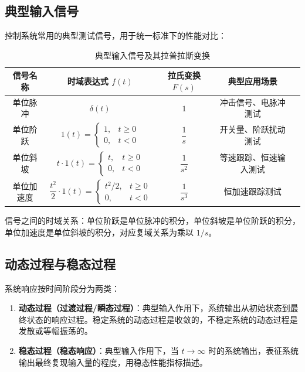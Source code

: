 \subsection{典型输入信号}
控制系统常用的典型测试信号，用于统一标准下的性能对比：
\begin{table}[htbp]
\centering
\caption{典型输入信号及其拉普拉斯变换}
\begin{tabular}{ccccc}
\toprule
信号名称 & 时域表达式 $f(t)$ & 拉氏变换 $F(s)$ & 典型应用场景 \\
\midrule
单位脉冲 & $\delta(t)$ & $1$ & 冲击信号、电脉冲测试 \\
单位阶跃 & $1(t) = \begin{cases} 1, & t\ge0 \\ 0, & t<0 \end{cases}$ & $\dfrac{1}{s}$ & 开关量、阶跃扰动测试 \\
单位斜坡 & $t\cdot1(t) = \begin{cases} t, & t\ge0 \\ 0, & t<0 \end{cases}$ & $\dfrac{1}{s^2}$ & 等速跟踪、恒速输入测试 \\
单位加速度 & $\dfrac{t^2}{2}\cdot1(t) = \begin{cases} t^2/2, & t\ge0 \\ 0, & t<0 \end{cases}$ & $\dfrac{1}{s^3}$ & 恒加速跟踪测试 \\
\bottomrule
\end{tabular}
\end{table}
信号之间的时域关系：单位阶跃是单位脉冲的积分，单位斜坡是单位阶跃的积分，单位加速度是单位斜坡的积分，对应复域关系为乘以 $1/s$。

\subsection{动态过程与稳态过程}
系统响应按时间阶段分为两类：
\begin{enumerate}
    \item \textbf{动态过程（过渡过程/瞬态过程）}：典型输入作用下，系统输出从初始状态到最终状态的响应过程。稳定系统的动态过程是收敛的，不稳定系统的动态过程是发散或等幅振荡的。
    \item \textbf{稳态过程（稳态响应）}：典型输入作用下，当 $t\to\infty$ 时的系统输出，表征系统输出最终复现输入量的程度，用稳态性能指标描述。
\end{enumerate}

